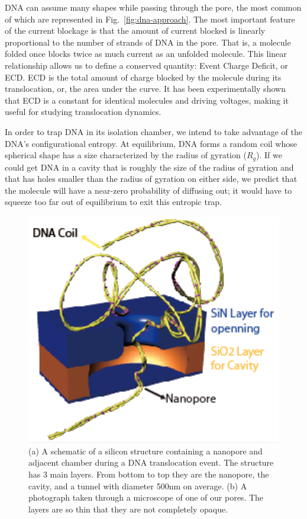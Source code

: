 \documentclass[aps,prl,preprint,groupedaddress]{revtex4}
\begin{document}
DNA can assume many shapes while passing through the pore, the most common of which are represented in Fig.~\ref{fig:dna-approach}.
The most important feature of the current blockage is that the amount of current blocked is linearly proportional to the number of strands of DNA in the pore.
That is, a molecule folded once blocks twice as much current as an unfolded molecule.
This linear relationship allows us to define a conserved quantity: Event Charge Deficit, or ECD.
ECD is the total amount of charge blocked by the molecule during its translocation, or, the area under the curve.
It has been experimentally shown that ECD is a constant for identical molecules and driving voltages, making it useful for studying translocation dynamics.

In order to trap DNA in its isolation chamber, we intend to take advantage of the DNA’s configurational entropy.
At equilibrium, DNA forms a random coil whose spherical shape has a size characterized by the radius of gyration ($R_g$).
If we could get DNA in a cavity that is roughly the size of the radius of gyration and that has holes smaller than the radius of gyration on either side, we predict that the molecule will have a near-zero probability of diffusing out; it would have to squeeze too far out of equilibrium to exit this entropic trap.\cite{trapping}

\begin{figure}[ht]
\centering
\includegraphics[width=1\textwidth]{figures/nanopore-schematic}
\caption{(a) A schematic of a silicon structure containing a nanopore and adjacent chamber during a DNA translocation event.
The structure has 3 main layers.
From bottom to top they are the nanopore, the cavity, and a tunnel with diameter 500nm on average.
(b) A photograph taken through a microscope of one of our pores.
The layers are so thin that they are not completely opaque.}
\label{fig:nanopore-schematic}
\end{figure}
\end{document}

